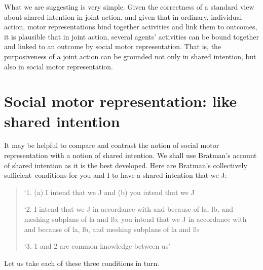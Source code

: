 \documentclass[12pt,\papersize]{extarticle}
\begin{document}


What we are suggesting is very simple.
Given the correctness of a standard view about shared intention in joint action, 
and 
given that in ordinary, individual action, motor representations  bind together activities and link them to outcomes,
it is plausible that 
in joint action, several agents' activities can be bound together and linked to an outcome by social motor representation.
That is,
the purposiveness of a joint action can be grounded not only in shared intention, but also in social motor representation.



\section{Social motor representation: like shared intention}
It may be helpful to compare and contrast the notion of social motor representation with a notion of shared intention. 
We shall use Bratman's account of shared intention as it is the best developed. 
Here are Bratman’s collectively sufficient\footnotemark \ conditions for you and I to have a shared intention that we J:
%
%
\begin{quote}
\label{quote:bratman_account}
`1. (a) I intend that we J and (b) you intend that we J
 
`2. I intend that we J in accordance with and because of la, lb, and meshing subplans of la and lb; you intend that we J in accordance with and because of la, lb, and meshing subplans of la and lb
 
`3. 1 and 2 are common knowledge between us' \citep[][p.\ View 4]{Bratman:1993je}
\end{quote}
%
Let us take each of these three conditions in turn.
\end{document}
